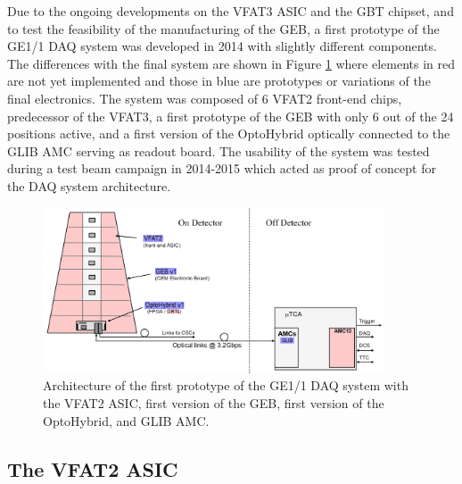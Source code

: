     Due to the ongoing developments on the VFAT3 ASIC and the GBT chipset, and to test the feasibility of the manufacturing of the GEB, a first prototype of the GE1/1 DAQ system was developed in 2014 with slightly different components. The differences with the final system are shown in Figure \ref{fig:II-2-gem-system-v1} where elements in red are not yet implemented and those in blue are prototypes or variations of the final electronics. The system was composed of 6 VFAT2 front-end chips, predecessor of the VFAT3, a first prototype of the GEB with only 6 out of the 24 positions active, and a first version of the OptoHybrid optically connected to the GLIB AMC serving as readout board. The usability of the system was tested during a test beam campaign in 2014-2015 which acted as proof of concept for the DAQ system architecture.

    \begin{figure}[h!]
      \centering
      \includegraphics[width=0.9\textwidth]{img/II-2-daq/gem-system-v1.pdf}
      \caption{Architecture of the first prototype of the GE1/1 DAQ system with the VFAT2 ASIC, first version of the GEB, first version of the OptoHybrid, and GLIB AMC.}
      \label{fig:II-2-gem-system-v1}
    \end{figure}

    \subsection{The VFAT2 ASIC}

